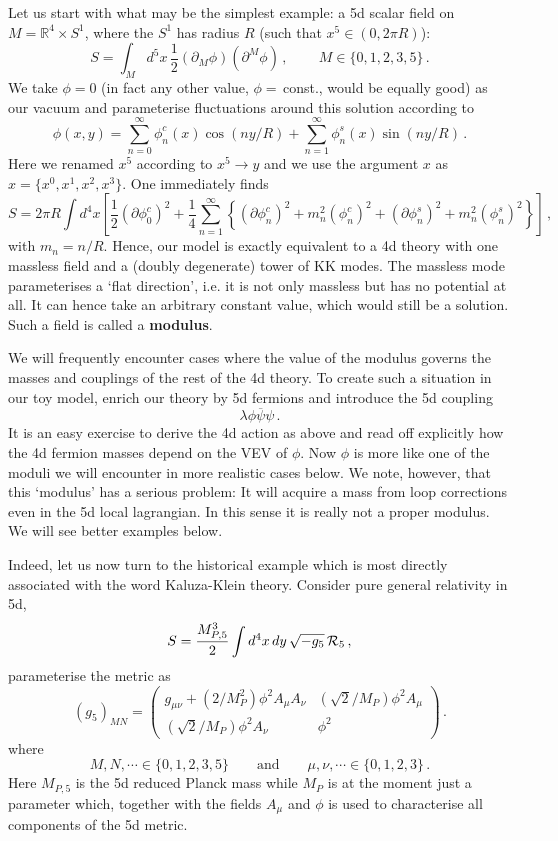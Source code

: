 \documentclass[12pt]{article}
\newcommand{\be}{\begin{equation}}
\newcommand{\ee}{\end{equation}}
\newcommand{\ol}{\overline}
\numberwithin{equation}{section}
\begin{document}
Let us start with what may be the simplest example: a 5d scalar field on $M=\mathbb{R}^4\times S^1$, where the $S^1$ has radius $R$ (such that $x^5\in (0,2\pi R)$):
\be
S=\int_M d^5x\,\frac{1}{2}(\partial_M\phi)(\partial^M\phi)\,,\,\qquad M\in\{0,1,2,3,5\}\,.
\ee
We take $\phi=0$ (in fact any other value, $\phi=\,$const., would be equally good) as our vacuum and parameterise fluctuations around this solution according to
\be
\phi(x,y)=\sum_{n=0}^\infty\phi^c_n(x)\cos(ny/R)+\sum_{n=1}^\infty\phi^s_n(x)
\sin(ny/R)\,.
\ee
Here we renamed $x^5$ according to $x^5\to y$ and we use the argument $x$ as $x=\{x^0,x^1,x^2,x^3\}$. One immediately finds
\be
S=2\pi R\int d^4x \left[ \frac{1}{2}(\partial\phi_0^c)^2+\frac{1}{4} \sum_{n=1}^\infty\left\{ (\partial\phi_n^c)^2+m_n^2(\phi_n^c)^2+
(\partial\phi_n^s)^2+m_n^2(\phi_n^s)^2 \right\} \right]\,,
\ee
with $m_n=n/R$. Hence, our model is exactly equivalent to a 4d theory with one massless field and a (doubly degenerate) tower of KK modes. The massless mode parameterises a `flat direction', i.e. it is not only massless but has no potential at all. It can hence take an arbitrary constant value, which would still be a solution. Such a field is called a {\bf modulus}.

We will frequently encounter cases where the value of the modulus governs the masses and couplings of the rest of the 4d theory. To create such a situation in our toy model, enrich our theory by 5d fermions and introduce the 5d coupling
\be
\lambda \phi\ol{\psi}\psi\,.
\ee
It is an easy exercise to derive the 4d action as above and read off explicitly how the 4d fermion masses depend on the VEV of $\phi$. Now $\phi$ is more like one of the moduli we will encounter in more realistic cases below. 
We note, however, that this `modulus' has a serious problem: It will acquire a mass from loop corrections even in the 5d local lagrangian. In this sense it is really not a proper modulus. We will see better examples below. 

Indeed, let us now turn to the historical example which is most directly associated with the word Kaluza-Klein theory. Consider pure general relativity in 5d,
\be
S=\frac{M_{P,5}^3}{2}\int d^4x\,dy\,\sqrt{-g_5}\,{\cal R}_5\,,
\ee
parameterise the metric as
\be
(g_5)_{MN}=\left(\begin{array}{cc}g_{\mu\nu}+(2/M_P^2)\phi^2 A_\mu A_\nu & (\sqrt{2}/M_P)\phi^2 A_\mu\\ (\sqrt{2}/M_P)\phi^2 A_\nu& \phi^2 \end{array}\right)\,.\label{mean}
\ee
where
\be
M,N,\cdots\in\{0,1,2,3,5\}\qquad\mbox{and}\qquad \mu,\nu,\cdots\in \{0,1,2,3\}\,.
\ee
Here $M_{P,5}$ is the 5d reduced Planck mass while $M_P$ is at the moment just a parameter which, together with the fields $A_\mu$ and $\phi$ is used to characterise all components of the 5d metric.
\end{document}
